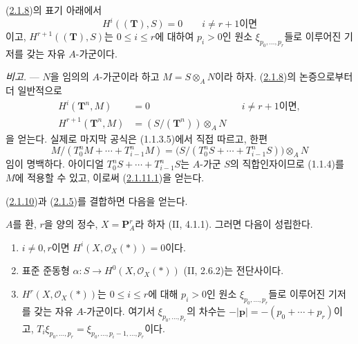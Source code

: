 \begin{corollary}[2.1.10]
\label{III.2.1.10-fr}
(\hyperref[III.2.1.8-fr]{2.1.8})의 표기 아래에서
\begin{equation}
\label{III.2.1.10.1-fr}
\tag{2.1.10.1}
H^i((\mathbf T),S)=0\qquad\text{$i\neq r+1$이면}
\end{equation}
이고, $H^{r+1}((\mathbf T),S)$는 $0\leq i\leq r$에 대하여
$p_i>0$인 원소 $\xi_{p_0,\ldots,p_r}$들로 이루어진 기저를 갖는 자유
$A$-가군이다.
\end{corollary}

\begin{env}[2.1.11]
\label{III.2.1.11-fr}
\emph{비고.} --- $N$을 임의의 $A$-가군이라 하고 $M=S\otimes_A N$이라
하자. (\hyperref[III.2.1.8-fr]{2.1.8})의 논증으로부터 더 일반적으로
\begin{align}
\label{III.2.1.11.1-fr}
\tag{2.1.11.1}
H^i(\mathbf T^n,M)&=0 &&\text{$i\neq r+1$이면},\\
\label{III.2.1.11.2-fr}
\tag{2.1.11.2}
H^{r+1}(\mathbf T^n,M)&=(S/(\mathbf T^n))\otimes_A N
\end{align}
을 얻는다. 실제로 마지막 공식은 (1.1.3.5)에서 직접 따르고, 한편
\[
M/(T_0^nM+\cdots+T_{i-1}^nM)
=\bigl(S/(T_0^nS+\cdots+T_{i-1}^nS)\bigr)\otimes_A N
\]
임이 명백하다. 아이디얼 $T_0^nS+\cdots+T_{i-1}^nS$는 $A$-가군
$S$의 직합인자이므로 (1.1.4)를 $M$에 적용할 수 있고, 이로써
(\hyperref[III.2.1.11.1-fr]{2.1.11.1})을 얻는다.
\end{env}

(\hyperref[III.2.1.10-fr]{2.1.10})과
(\hyperref[III.2.1.5-fr]{2.1.5})를 결합하면 다음을 얻는다.

\begin{proposition}[2.1.12]
\label{III.2.1.12-fr}
$A$를 환, $r$을 양의 정수, $X=\mathbf P_A^r$라 하자 (II, 4.1.1).
그러면 다음이 성립한다.
\begin{enumerate}
\item[{\rm(i)}] $i\neq0,r$이면 $H^i(X,\mathcal O_X(*))=0$이다.
\item[{\rm(ii)}] 표준 준동형
$\alpha:S\to H^0(X,\mathcal O_X(*))$ (II, 2.6.2)는 전단사이다.
\item[{\rm(iii)}] $H^r(X,\mathcal O_X(*))$는 $0\leq i\leq r$에 대해
$p_i>0$인 원소 $\xi_{p_0,\ldots,p_r}$들로 이루어진 기저를 갖는 자유
$A$-가군이다. 여기서 $\xi_{p_0,\ldots,p_r}$의 차수는
$-|\mathbf p|=-(p_0+\cdots+p_r)$이고,
$T_i\xi_{p_0,\ldots,p_r}=\xi_{p_0,\ldots,p_i-1,\ldots,p_r}$이다.
\end{enumerate}
\end{proposition}

